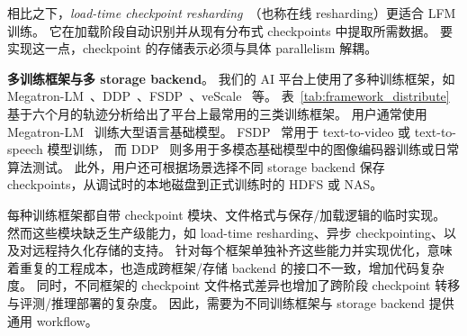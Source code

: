相比之下，\textit{load-time checkpoint resharding}~\cite{torch-dcp}（也称在线 resharding）更适合 LFM 训练。
它在加载阶段自动识别并从现有分布式 checkpoints 中提取所需数据。
要实现这一点，checkpoint 的存储表示必须与具体 parallelism 解耦。

\begin{table}[!t]
\caption{
不同场景下离线 resharding 作业的平均完成时间。
}
\label{tab:resharding_duration}
\end{table}

\begin{table}[!t]
\caption{平台上使用最广泛的三类训练框架
}
\label{tab:framework_distribute}
\end{table}

\noindent \textbf{多训练框架与多 storage backend}。
我们的 AI 平台上使用了多种训练框架，如 Megatron-LM~\cite{megatron}、DDP~\cite{ddp}、FSDP~\cite{fsdp}、veScale~\cite{megascale, vescale} 等。
表~\ref{tab:framework_distribute} 基于六个月的轨迹分析给出了平台上最常用的三类训练框架。
用户通常使用 Megatron-LM~\cite{megatron} 训练大型语言基础模型。
FSDP~\cite{fsdp} 常用于 text-to-video 或 text-to-speech 模型训练，
而 DDP~\cite{ddp} 则多用于多模态基础模型中的图像编码器训练或日常算法测试。
此外，用户还可根据场景选择不同 storage backend 保存 checkpoints，从调试时的本地磁盘到正式训练时的 HDFS 或 NAS。

每种训练框架都自带 checkpoint 模块、文件格式与保存/加载逻辑的临时实现。
然而这些模块缺乏生产级能力，如 load-time resharding、异步 checkpointing、以及对远程持久化存储的支持。
针对每个框架单独补齐这些能力并实现优化，意味着重复的工程成本，也造成跨框架/存储 backend 的接口不一致，增加代码复杂度。
同时，不同框架的 checkpoint 文件格式差异也增加了跨阶段 checkpoint 转移与评测/推理部署的复杂度。
因此，需要为不同训练框架与 storage backend 提供通用 workflow。

